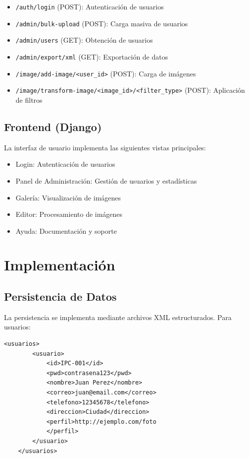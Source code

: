 \documentclass[letterpaper,12pt]{article}
\begin{document}
\begin{multicols}{2}
    \begin{itemize}
        \item \texttt{/auth/login} (POST): Autenticación de usuarios
        \item \texttt{/admin/bulk-upload} (POST): Carga masiva de usuarios
        \item \texttt{/admin/users} (GET): Obtención de usuarios
        \item \texttt{/admin/export/xml} (GET): Exportación de datos
        \item \texttt{/image/add-image/<user\_id>} (POST): Carga de imágenes
        \item \texttt{/image/transform-image/<image\_id>/<filter\_type>} (POST): Aplicación de filtros
    \end{itemize}

    \subsection*{Frontend (Django)}
    La interfaz de usuario implementa las siguientes vistas principales:

    \begin{itemize}
        \item Login: Autenticación de usuarios
        \item Panel de Administración: Gestión de usuarios y estadísticas
        \item Galería: Visualización de imágenes
        \item Editor: Procesamiento de imágenes
        \item Ayuda: Documentación y soporte
    \end{itemize}

    \section*{Implementación}
    \subsection*{Persistencia de Datos}
    La persistencia se implementa mediante archivos XML estructurados. Para usuarios:

    \begin{lstlisting}[basicstyle=\small, breaklines=true]
        <usuarios>
        <usuario>
            <id>IPC-001</id>
            <pwd>contrasena123</pwd>
            <nombre>Juan Perez</nombre>
            <correo>juan@email.com</correo>
            <telefono>12345678</telefono>
            <direccion>Ciudad</direccion>
            <perfil>http://ejemplo.com/foto
            </perfil>
        </usuario>
    </usuarios>
    \end{lstlisting}


\end{multicols}
\end{document}
